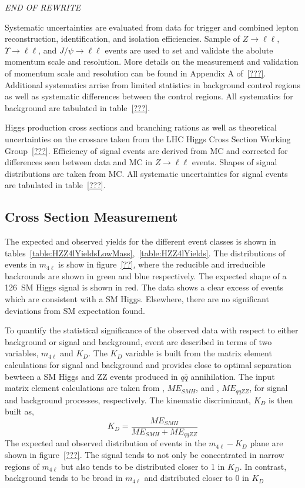 {\it END OF REWRITE}

Systematic uncertainties are evaluated from data for trigger 
and combined lepton reconstruction, identification, and
isolation efficiencies.  Sample of $Z\to\ell\ell$, 
$\Upsilon\to\ell\ell$, and $J/\psi\to\ell\ell$ events are used
to set and validate the abolute momentum scale and resolution.  
More details on the measurement and validation of momentum 
scale and resolution can be found in Appendix A of~\ref{???}.
Additional systematics arrise from limited statistics in 
background control regions as well as systematic differences 
between the control regions.  All systematics for background
are tabulated in table~\ref{???}.

Higgs production cross sections and branching rations as well 
as theoretical uncertainties on the crossare taken from the LHC 
Higgs Cross Section Working Group~\ref{???}.  Efficiency of 
signal events are derived from MC and corrected for differences
seen between data and MC in $Z\to\ell\ell$ events.  Shapes of 
signal distributions are taken from MC.  All systematic 
uncertainties for signal events are tabulated in table~\ref{???}.

\subsection{Cross Section Measurement}
\label{sec:HZZ4lxsec}

The expected and observed yields for the different event classes
is shown in tables~\ref{table:HZZ4lYieldsLowMass},~\ref{table:HZZ4lYields}.  
The distributions of events in $m_{4\ell}$ is show in figure~\ref{??},
where the reducible and irreducible backrounds are shown in green
and blue respectively.  The expected shape of a 126~\GeV SM Higgs
signal is shown in red.  The data shows a clear excess of events 
which are consistent with a SM Higgs.  Elsewhere, there are no
significant deviations from SM expectation found.  

To quantify the statistical significance of the observed data
with respect to either background or signal and background, event
are described in terms of two variables, $m_{4\ell}$ and $K_D$.
The $K_D$ variable is built from the matrix element calculations
for signal and background and provides close to optimal separation
bewteen a SM Higgs and ZZ events produced in $q\bar{q}$
annihilation.  The input matrix element calculations are taken
from \JHUGen, $ME_{SMH}$, and \MCFM, $ME_{qqZZ}$, for signal and 
background processes, respectively.  The kinematic discriminant, 
$K_D$ is then built as,
\begin{equation}
K_D = \frac{ME_{SMH}}{ME_{SMH}+ME_{qqZZ}}
\end{equation}
The expected and observed distribution of events in the 
$m_{4\ell}-K_D$ plane are shown in figure~\ref{???}.  The signal
tends to not only be concentrated in narrow regions of $m_{4\ell}$
but also tends to be distributed closer to 1 in $K_D$.  In 
contrast, background tends to be broad in $m_{4\ell}$ and
distributed closer to 0 in $K_D$

